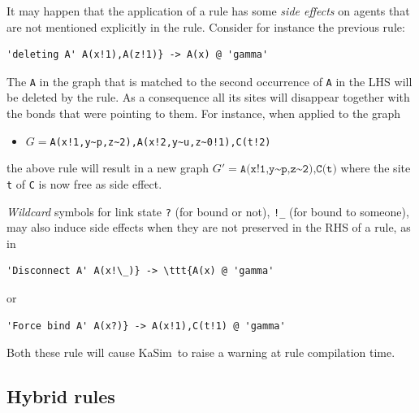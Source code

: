 \documentclass[11pt]{book}
\def\KaSim{\textsf{KaSim}}
\def\intstate{\textasciitilde}
\def\ttt#1{\texttt{#1}}
\def\ITE#1{\begin{itemize}#1\end{itemize}}
\begin{document}
It may happen that the application of a rule has some \emph{side effects} on agents that are not mentioned explicitly in the rule. Consider for instance the previous rule:
\begin{lstlisting}[language=kappa]
'deleting A' A(x!1),A(z!1)} -> A(x) @ 'gamma' 
\end{lstlisting}
The \ttt{A} in the graph that is matched to the second occurrence of \ttt{A} in the LHS will be deleted by the rule. As a consequence all its sites will disappear together with the bonds that were pointing to them. For instance, when applied to the graph 
\ITE{
\item[] $G=$\ttt{A(x!1,y\intstate p,z\intstate2),A(x!2,y\intstate u,z\intstate0!1),C(t!2)}
} 
the above rule will result in a new graph $G' =\ttt{A(x!1,y{\intstate}p,z\intstate2),C(t)}$ where the site \ttt{t} of \ttt{C} is now free as side effect.

\emph{Wildcard} symbols for link state \ttt{?} (for bound or not), \ttt{!\_} (for bound to someone), may also induce side effects when they are not preserved in the RHS of a rule, as in
\begin{lstlisting}[language=kappa]
'Disconnect A' A(x!\_)} -> \ttt{A(x) @ 'gamma' 
\end{lstlisting}
or 
\begin{lstlisting}[language=kappa]
'Force bind A' A(x?)} -> A(x!1),C(t!1) @ 'gamma' 
\end{lstlisting}
Both these rule will cause \KaSim~to raise a warning at rule compilation time.

\subsection{Hybrid rules}\label{sec:hybrid}
\end{document}
